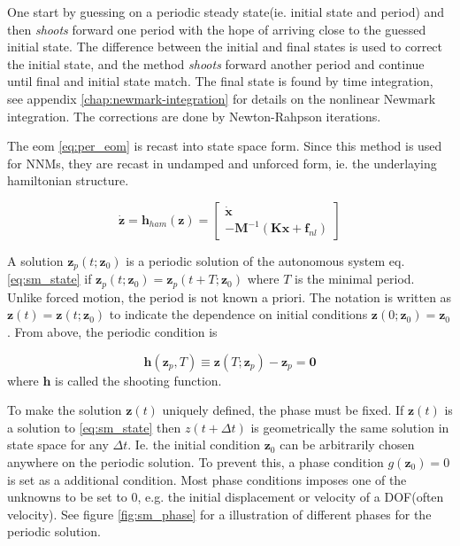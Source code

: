 One start by guessing on a periodic steady state(ie. initial state
and period) and then \textit{shoots} forward one period with the hope of
arriving close to the guessed initial state. The difference between the initial
and final states is used to correct the initial state, and the method
\textit{shoots} forward another period and continue until final and initial
state match.
The final state is found by time integration, see appendix
\ref{chap:newmark-integration} for details on the nonlinear Newmark integration.
The corrections are done by Newton-Rahpson iterations.

The eom \eqref{eq:per_eom} is recast into state space form. Since this method is
used for NNMs, they are recast in undamped and unforced form, ie. the underlaying
hamiltonian structure.

\begin{equation}
  \label{eq:sm_state}
  \dot{\bm z} = \bm h_{ham} (\bm z) =
  \begin{bmatrix}
    \dot{\bm x} \\
    -\bm M^{-1}(\bm K \bm x  + \bm f_{nl})
  \end{bmatrix}
\end{equation}


A solution $\bm z_p(t; \bm z_0)$ is a periodic solution of the autonomous system
eq. \eqref{eq:sm_state} if $\bm z_p(t; \bm z_{0}) = \bm z_p(t+T; \bm z_{0})$
where $T$ is the minimal period. Unlike forced motion, the period is not known a
priori. The notation is written as $\bm z(t)=\bm z(t; \bm z_0)$ to indicate the
dependence on initial conditions $\bm z(0; \bm z_0) = \bm z_0$.
From above, the periodic condition is

\begin{equation}
  \label{eq:sm_per_cond}
  \bm h(\bm z_{p},T) \equiv \bm z(T; \bm z_{p}) - \bm z_{p} = \bm 0
\end{equation}
where $\bm h$ is called the shooting function.


To make the solution $\bm z(t)$ uniquely defined, the phase must be fixed. If
$\bm z(t)$ is a solution to \eqref{eq:sm_state} then $z(t + \Delta t)$ is
geometrically the same solution in state space for any $\Delta t$. Ie. the
initial condition $\bm z_{0}$ can be arbitrarily chosen anywhere on the
periodic solution. To prevent this, a phase condition $g(\bm z_{0})=0$ is set
as a additional condition. Most phase conditions imposes one of the unknowns to
be set to 0, e.g. the initial displacement or velocity of a DOF(often velocity).
See figure \ref{fig:sm_phase} for a illustration of different phases for the
periodic solution.

